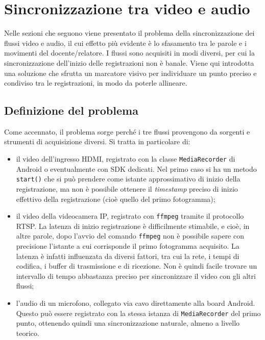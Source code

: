 \chapter{Sincronizzazione tra video e audio}
\label{cha:sync}

Nelle sezioni che seguono viene presentato il problema della sincronizzazione dei flussi video e audio, il cui effetto più evidente è lo sfasamento tra le parole e i movimenti del docente/relatore. I flussi sono acquisiti in modi diversi, per cui la sincronizzazione dell'inizio delle registrazioni non è banale. Viene qui introdotta una soluzione che sfrutta un marcatore visivo per individuare un punto preciso e condiviso tra le registrazioni, in modo da poterle allineare.

\section{Definizione del problema}
\label{sec:sync_problema}

Come accennato, il problema sorge perché i tre flussi provengono da sorgenti e strumenti di acquisizione diversi. Si tratta in particolare di:

\begin{itemize}
	\item il video dell'ingresso HDMI, registrato con la classe \texttt{MediaRecorder} di Android o eventualmente con SDK dedicati. Nel primo caso si ha un metodo \texttt{start()} che si può prendere come istante approssimativo di inizio della registrazione, ma non è possibile ottenere il \emph{timestamp} preciso di inizio effettivo della registrazione (cioè quello del primo fotogramma);
	\item il video della videocamera IP, registrato con \texttt{ffmpeg} tramite il protocollo RTSP. La latenza di inizio registrazione è difficilmente stimabile, e cioè, in altre parole, dopo l'avvio del comando \texttt{ffmpeg} non è possibile sapere con precisione l'istante a cui corrisponde il primo fotogramma acquisito. La latenza è infatti influenzata da diversi fattori, tra cui la rete, i tempi di codifica, i buffer di trasmissione e di ricezione. Non è quindi facile trovare un intervallo di tempo abbastanza preciso per sincronizzare il video con gli altri flussi;
	\item l'audio di un microfono, collegato via cavo direttamente alla board Android. Questo può essere registrato con la stessa istanza di \texttt{MediaRecorder} del primo punto, ottenendo quindi una sincronizzazione naturale, almeno a livello teorico.
\end{itemize}

